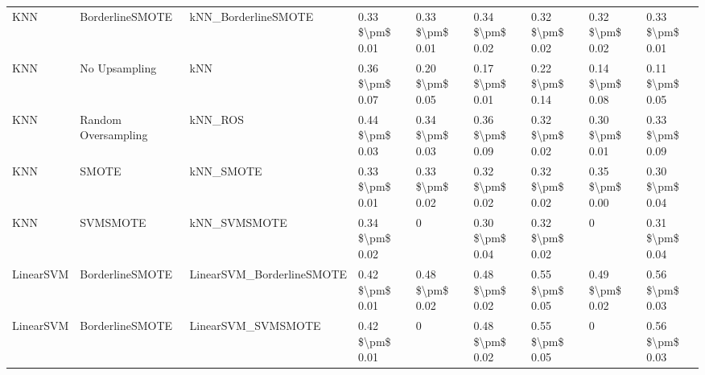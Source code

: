 \begin{tabular}{lllllllll}
                            KNN &               BorderlineSMOTE &                          kNN\_BorderlineSMOTE & 0.33 \$\textbackslash pm\$ 0.01 &           0.33 \$\textbackslash pm\$ 0.01 &       0.34 \$\textbackslash pm\$ 0.02 &        0.32 \$\textbackslash pm\$ 0.02 &                         0.32 \$\textbackslash pm\$ 0.02 &     0.33 \$\textbackslash pm\$ 0.01 \\
                            KNN &                 No Upsampling &                                          kNN & 0.36 \$\textbackslash pm\$ 0.07 &           0.20 \$\textbackslash pm\$ 0.05 &       0.17 \$\textbackslash pm\$ 0.01 &        0.22 \$\textbackslash pm\$ 0.14 &                         0.14 \$\textbackslash pm\$ 0.08 &     0.11 \$\textbackslash pm\$ 0.05 \\
                            KNN &           Random Oversampling &                                      kNN\_ROS & 0.44 \$\textbackslash pm\$ 0.03 &           0.34 \$\textbackslash pm\$ 0.03 &       0.36 \$\textbackslash pm\$ 0.09 &        0.32 \$\textbackslash pm\$ 0.02 &                         0.30 \$\textbackslash pm\$ 0.01 &     0.33 \$\textbackslash pm\$ 0.09 \\
                            KNN &                         SMOTE &                                    kNN\_SMOTE & 0.33 \$\textbackslash pm\$ 0.01 &           0.33 \$\textbackslash pm\$ 0.02 &       0.32 \$\textbackslash pm\$ 0.02 &        0.32 \$\textbackslash pm\$ 0.02 &                         0.35 \$\textbackslash pm\$ 0.00 &     0.30 \$\textbackslash pm\$ 0.04 \\
                            KNN &                      SVMSMOTE &                                 kNN\_SVMSMOTE & 0.34 \$\textbackslash pm\$ 0.02 &                         0 &       0.30 \$\textbackslash pm\$ 0.04 &        0.32 \$\textbackslash pm\$ 0.02 &                                       0 &     0.31 \$\textbackslash pm\$ 0.04 \\
                      LinearSVM &               BorderlineSMOTE &                    LinearSVM\_BorderlineSMOTE & 0.42 \$\textbackslash pm\$ 0.01 &           0.48 \$\textbackslash pm\$ 0.02 &       0.48 \$\textbackslash pm\$ 0.02 &        0.55 \$\textbackslash pm\$ 0.05 &                         0.49 \$\textbackslash pm\$ 0.02 &     0.56 \$\textbackslash pm\$ 0.03 \\
                      LinearSVM &               BorderlineSMOTE &                           LinearSVM\_SVMSMOTE & 0.42 \$\textbackslash pm\$ 0.01 &                         0 &       0.48 \$\textbackslash pm\$ 0.02 &        0.55 \$\textbackslash pm\$ 0.05 &                                       0 &     0.56 \$\textbackslash pm\$ 0.03 \\

\end{tabular}
